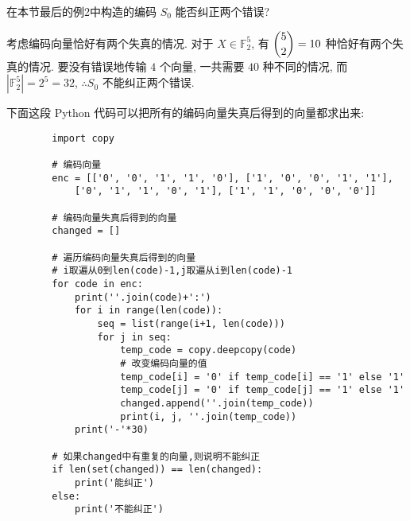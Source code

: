 \documentclass{ctexart}
\begin{document}
\begin{exercise}[3.12]
    在本节最后的例2中构造的编码 $S_0$ 能否纠正两个错误?
\end{exercise}
\begin{solution}
    考虑编码向量恰好有两个失真的情况. 对于 $X\in \mathbb{F}_2^5$, 有 $\dbinom{5}{2}=10$ 种恰好有两个失真的情况. 要没有错误地传输 $4$ 个向量, 一共需要 $40$ 种不同的情况, 而 $|\mathbb{F}_2^5|=2^5=32$, $\therefore S_0$ 不能纠正两个错误.

    下面这段 Python 代码可以把所有的编码向量失真后得到的向量都求出来:
    \begin{verbatim}
        import copy

        # 编码向量
        enc = [['0', '0', '1', '1', '0'], ['1', '0', '0', '1', '1'],
            ['0', '1', '1', '0', '1'], ['1', '1', '0', '0', '0']]

        # 编码向量失真后得到的向量
        changed = []

        # 遍历编码向量失真后得到的向量
        # i取遍从0到len(code)-1,j取遍从i到len(code)-1
        for code in enc:
            print(''.join(code)+':')
            for i in range(len(code)):
                seq = list(range(i+1, len(code)))
                for j in seq:
                    temp_code = copy.deepcopy(code)
                    # 改变编码向量的值
                    temp_code[i] = '0' if temp_code[i] == '1' else '1'
                    temp_code[j] = '0' if temp_code[j] == '1' else '1'
                    changed.append(''.join(temp_code))
                    print(i, j, ''.join(temp_code))
            print('-'*30)

        # 如果changed中有重复的向量,则说明不能纠正
        if len(set(changed)) == len(changed):
            print('能纠正')
        else:
            print('不能纠正')
    \end{verbatim}
\end{solution}
\end{document}
